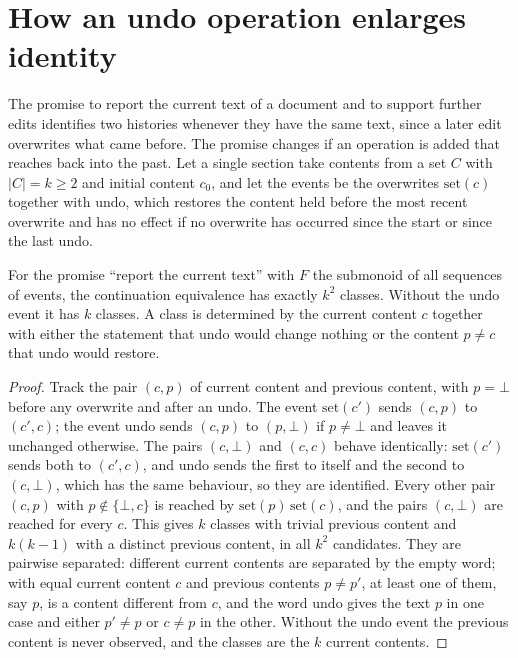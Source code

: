 \section{How an undo operation enlarges identity}\label{sec:undo}

The promise to report the current text of a document and to support further edits identifies two histories whenever they have the same text, since a later edit overwrites what came before. The promise changes if an operation is added that reaches back into the past. Let a single section take contents from a set $C$ with $|C|=k\ge2$ and initial content $c_0$, and let the events be the overwrites $\mathrm{set}(c)$ together with $\mathrm{undo}$, which restores the content held before the most recent overwrite and has no effect if no overwrite has occurred since the start or since the last undo.

\begin{newresult}\label{prop:undo-identity}
For the promise ``report the current text'' with $F$ the submonoid of all sequences of events, the continuation equivalence has exactly $k^{2}$ classes. Without the undo event it has $k$ classes. A class is determined by the current content $c$ together with either the statement that undo would change nothing or the content $p\ne c$ that undo would restore.
\end{newresult}
\begin{proof}
Track the pair $(c,p)$ of current content and previous content, with $p=\bot$ before any overwrite and after an undo. The event $\mathrm{set}(c')$ sends $(c,p)$ to $(c',c)$; the event $\mathrm{undo}$ sends $(c,p)$ to $(p,\bot)$ if $p\ne\bot$ and leaves it unchanged otherwise. The pairs $(c,\bot)$ and $(c,c)$ behave identically: $\mathrm{set}(c')$ sends both to $(c',c)$, and $\mathrm{undo}$ sends the first to itself and the second to $(c,\bot)$, which has the same behaviour, so they are identified. Every other pair $(c,p)$ with $p\notin\{\bot,c\}$ is reached by $\mathrm{set}(p)\,\mathrm{set}(c)$, and the pairs $(c,\bot)$ are reached for every $c$. This gives $k$ classes with trivial previous content and $k(k-1)$ with a distinct previous content, in all $k^{2}$ candidates. They are pairwise separated: different current contents are separated by the empty word; with equal current content $c$ and previous contents $p\ne p'$, at least one of them, say $p$, is a content different from $c$, and the word $\mathrm{undo}$ gives the text $p$ in one case and either $p'\ne p$ or $c\ne p$ in the other. Without the undo event the previous content is never observed, and the classes are the $k$ current contents.
\end{proof}

